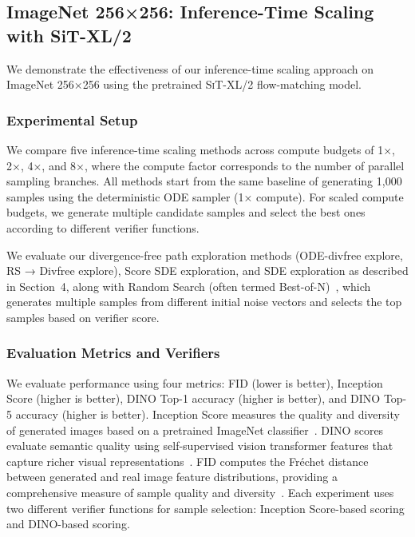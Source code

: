 \documentclass{article}
\begin{document}
\subsection{ImageNet 256×256: Inference-Time Scaling with SiT-XL/2}

We demonstrate the effectiveness of our inference-time scaling approach on ImageNet 256×256 using the pretrained \textsc{SiT-XL/2} flow-matching model.

\subsubsection{Experimental Setup}

We compare five inference-time scaling methods across compute budgets of 1×, 2×, 4×, and 8×, where the compute factor corresponds to the number of parallel sampling branches. All methods start from the same baseline of generating 1,000 samples using the deterministic ODE sampler (1× compute). For scaled compute budgets, we generate multiple candidate samples and select the best ones according to different verifier functions.

We evaluate our divergence-free path exploration methods (ODE-divfree explore, RS → Divfree explore), Score SDE exploration, and SDE exploration as described in Section~4, along with Random Search (often termed Best-of-N)~\cite{ma2025diffits}, which generates multiple samples from different initial noise vectors and selects the top samples based on verifier score.

\subsubsection{Evaluation Metrics and Verifiers}

We evaluate performance using four metrics: FID (lower is better), Inception Score (higher is better), DINO Top-1 accuracy (higher is better), and DINO Top-5 accuracy (higher is better). Inception Score measures the quality and diversity of generated images based on a pretrained ImageNet classifier~\cite{salimans2016improved}. DINO scores evaluate semantic quality using self-supervised vision transformer features that capture richer visual representations~\cite{caron2021emerging}. FID computes the Fréchet distance between generated and real image feature distributions, providing a comprehensive measure of sample quality and diversity~\cite{heusel2017gans}. Each experiment uses two different verifier functions for sample selection: Inception Score-based scoring and DINO-based scoring.
\end{document}
